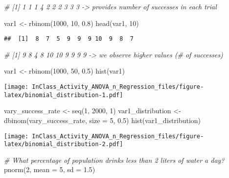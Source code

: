 \documentclass[
]{article}
\newenvironment{Shaded}{\begin{snugshade}}{\end{snugshade}}
\newcommand{\AttributeTok}[1]{\textcolor[rgb]{0.77,0.63,0.00}{#1}}
\newcommand{\CommentTok}[1]{\textcolor[rgb]{0.56,0.35,0.01}{\textit{#1}}}
\newcommand{\DecValTok}[1]{\textcolor[rgb]{0.00,0.00,0.81}{#1}}
\newcommand{\FloatTok}[1]{\textcolor[rgb]{0.00,0.00,0.81}{#1}}
\newcommand{\FunctionTok}[1]{\textcolor[rgb]{0.00,0.00,0.00}{#1}}
\newcommand{\NormalTok}[1]{#1}
\newcommand{\OtherTok}[1]{\textcolor[rgb]{0.56,0.35,0.01}{#1}}
\begin{document}
\begin{Shaded}
\begin{Highlighting}[]
\CommentTok{\# [1] 1 1 1 4 2 2 2 3 3 3  {-}\textgreater{} provides number of successes in each trial}

\NormalTok{var1 }\OtherTok{\textless{}{-}} \FunctionTok{rbinom}\NormalTok{(}\DecValTok{1000}\NormalTok{, }\DecValTok{10}\NormalTok{, }\FloatTok{0.8}\NormalTok{)}
\FunctionTok{head}\NormalTok{(var1, }\DecValTok{10}\NormalTok{)}
\end{Highlighting}
\end{Shaded}

\begin{verbatim}
##  [1]  8  7  5  9  9  9 10  9  8  7
\end{verbatim}

\begin{Shaded}
\begin{Highlighting}[]
\CommentTok{\# [1]  9  8  4  8 10 10  9  9  9  9 {-}\textgreater{} we observe higher values (\# of successes)}

\NormalTok{var1 }\OtherTok{\textless{}{-}} \FunctionTok{rbinom}\NormalTok{(}\DecValTok{1000}\NormalTok{, }\DecValTok{50}\NormalTok{, }\FloatTok{0.5}\NormalTok{)}
\FunctionTok{hist}\NormalTok{(var1)}
\end{Highlighting}
\end{Shaded}

\texttt{[image: InClass\_Activity\_ANOVA\_n\_Regression\_files/figure-latex/binomial\_distribution-1.pdf]}

\begin{Shaded}
\begin{Highlighting}[]
\NormalTok{vary\_success\_rate }\OtherTok{\textless{}{-}} \FunctionTok{seq}\NormalTok{(}\DecValTok{1}\NormalTok{, }\DecValTok{2000}\NormalTok{, }\DecValTok{1}\NormalTok{)}
\NormalTok{var1\_distribution }\OtherTok{\textless{}{-}} \FunctionTok{dbinom}\NormalTok{(vary\_success\_rate,}
                            \AttributeTok{size =} \DecValTok{5}\NormalTok{,}
                            \FloatTok{0.5}\NormalTok{)}
\FunctionTok{hist}\NormalTok{(var1\_distribution)}
\end{Highlighting}
\end{Shaded}

\texttt{[image: InClass\_Activity\_ANOVA\_n\_Regression\_files/figure-latex/binomial\_distribution-2.pdf]}

\begin{Shaded}
\begin{Highlighting}[]
\CommentTok{\# What percentage of population drinks less than 2 liters of water a day?   }
\FunctionTok{pnorm}\NormalTok{(}\DecValTok{2}\NormalTok{, }\AttributeTok{mean =} \DecValTok{5}\NormalTok{, }\AttributeTok{sd =} \FloatTok{1.5}\NormalTok{)}
\end{Highlighting}
\end{Shaded}
\end{document}

